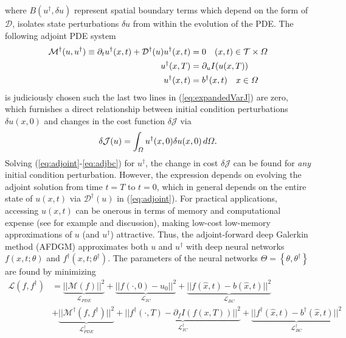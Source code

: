 \documentclass{jfm}
\begin{document}
where $B(u^\dagger,\delta u)$ represent spatial boundary terms which depend on the form of $\mathcal{D}$, isolates state perturbations $\delta u$ from within the evolution of the PDE. 
The following adjoint PDE system 
\begin{align}\noindent \label{eq:adjoint}
    \mathcal{M}^\dagger(u,u^\dagger) \equiv \partial_t u^\dagger(x,t) + \mathcal{D}^\dagger(u) u^\dagger(x,t) &= 0 \quad (x,t) \in \mathcal{T}\times \Omega\\
    u^\dagger(x,T)&=\partial_u I(u(x,T))\\\label{eq:adjbc}
    u^\dagger(x,t)&=b^\dagger(x,t)\quad x \in \Omega
\end{align}
is judiciously chosen such the last two lines in (\ref{eq:expandedVarJ}) are zero, which furnishes a direct relationship between initial condition perturbations $\delta u(x,0)$ and changes in the cost function $\delta \mathcal{J}$ via
\begin{equation}\nonumber
    \delta \mathcal{J}(u) =\int_\Omega u^\dagger(x,0)\delta u(x,0)\,d\Omega.\\
\end{equation}
Solving (\ref{eq:adjoint}-\ref{eq:adjbc}) for $u^\dagger$, the change in cost $\delta \mathcal{J}$ can be found for \textit{any} initial condition perturbation. However, the expression depends on evolving the adjoint solution from time $t=T$ to $t=0$, which in general depends on the entire state of $u(x,t)$ via $\mathcal{D}^\dagger(u)$ in (\ref{eq:adjoint}).  For practical applications, accessing $u(x,t)$ can be onerous in terms of memory and computational expense (see \cite{vishnampet2015practical} for example and discussion), making low-cost low-memory approximations of $u$ (and $u^\dagger$) attractive. Thus, the adjoint-forward deep Galerkin method (AFDGM) approximates both $u$ and $u^\dagger$ with deep neural networks $f(x,t; \theta)$ and $f^\dagger(x,t; \theta^\dagger)$. The parameters of the neural networks $\Theta=\left\{\theta,\theta^\dagger \right\}$ are found by minimizing 
\begin{align}\label{eq:loss}\mathcal{L}(f,f^\dagger) &= \underbrace{||\mathcal{M}(f)||^2}_{\mathcal{L}_{PDE}} + \underbrace{||f(\cdot,0)-u_0||^2}_{\mathcal{L}_{IC}} + \underbrace{||f(\hat{x},t)-b(\hat{x},t)||^2}_{\mathcal{L}_{BC}}\\ 
    &+\underbrace{||\mathcal{M}^\dagger(f,f^\dagger)||^2}_{\mathcal{L}^\dagger_{PDE}} + \underbrace{||f^\dagger(\cdot,T)-\partial_f I(f(x,T))||^2}_{\mathcal{L}^\dagger_{IC}} + \underbrace{||f^\dagger(\hat{x},t)-b^\dagger(\hat{x},t)||^2}_{\mathcal{L}^\dagger_{BC}}\nonumber
    \end{align}
\end{document}
